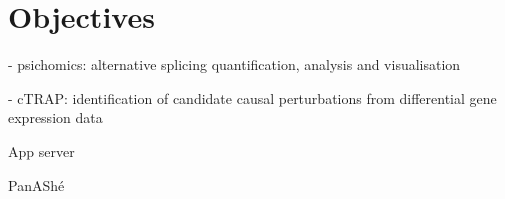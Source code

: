 \chapter{Objectives}

- psichomics: alternative splicing quantification, analysis and visualisation

- cTRAP: identification of candidate causal perturbations from differential gene expression data

App server

PanAShé
